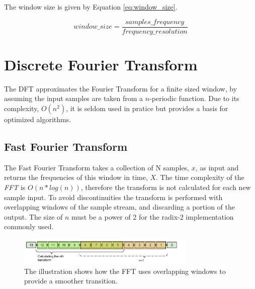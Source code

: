 The window size is given by Equation \ref{eq:window_size}.


\begin{equation} \label{eq:window_size}
window\_size = \frac{samples\_frequency}{frequency\_resolution}
\end{equation}



\section{Discrete Fourier Transform}\label{appendix:DFT}

The DFT approximates the Fourier Transform for a finite sized window, by assuming the
input samples are taken from a $n$-periodic function. Due to its complexity, $O(n^2)$,
it is seldom used in pratice but provides a basis for optimized algorithms.

%
%


\subsection{Fast Fourier Transform}\label{appendix:FFT}
The Fast Fourier Transform takes a collection of N samples, $x$, as input
and returns the frequencies of this window in time, $X$.
The time complexity of the {\it FFT} is $O(n*log(n))$, therefore the transform is not
calculated for each new sample input. To avoid discontinuities the transform is performed
with overlapping windows of the sample stream, and discarding a portion of the output.
The size of $n$ must be a power of 2 for the radix-2 implementation commonly used.

\begin{figure}[H]
    \centering
    \includegraphics[height=50px]{figures/theory/fft_window_overlap}
    \caption{The illustration shows how the FFT uses overlapping windows to provide a smoother transition. }
    \label{fig:fft_window_overlap}
\end{figure}

